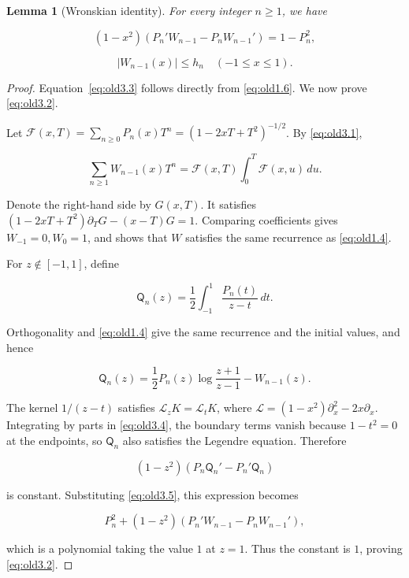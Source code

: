 \documentclass[11pt,a4paper]{article}
\numberwithin{equation}{section}
\newtheorem{lemma}[theorem]{Lemma}
\theoremstyle{definition}
\begin{document}
\begin{lemma}[Wronskian identity]\label{lem:wronskian}
For every integer \(n\ge1\), we have

\begin{equation}
(1-x^2)(P_n'W_{n-1}-P_nW_{n-1}')=1-P_n^2,
\label{eq:old3.2}
\end{equation}

\begin{equation}
|W_{n-1}(x)|\le h_n\quad(-1\le x\le1).
\label{eq:old3.3}
\end{equation}
\end{lemma}

\begin{proof}
Equation~\eqref{eq:old3.3} follows directly from \eqref{eq:old1.6}. We now prove \eqref{eq:old3.2}.

Let \(\mathcal F(x,T)=\sum_{n\ge0}P_n(x)T^n=(1-2xT+T^2)^{-1/2}\). By \eqref{eq:old3.1},

\[
\sum_{n\ge1}W_{n-1}(x)T^n
=\mathcal F(x,T)\int_0^T\mathcal F(x,u)\,du.
\]

Denote the right-hand side by \(G(x,T)\). It satisfies \((1-2xT+T^2)\partial_T G-(x-T)G=1\). Comparing coefficients gives \(W_{-1}=0,W_0=1\), and shows that \(W\) satisfies the same recurrence as \eqref{eq:old1.4}.

For \(z\notin[-1,1]\), define

\begin{equation}
\mathsf Q_n(z)=\frac12\int_{-1}^1\frac{P_n(t)}{z-t}\,dt.
\label{eq:old3.4}
\end{equation}

Orthogonality and \eqref{eq:old1.4} give the same recurrence and the initial values, and hence

\begin{equation}
\mathsf Q_n(z)=\frac12P_n(z)\log\frac{z+1}{z-1}-W_{n-1}(z).
\label{eq:old3.5}
\end{equation}

The kernel \(1/(z-t)\) satisfies \(\mathcal L_zK=\mathcal L_tK\), where \(\mathcal L=(1-x^2)\partial_x^2-2x\partial_x\). Integrating by parts in \eqref{eq:old3.4}, the boundary terms vanish because \(1-t^2=0\) at the endpoints, so \(\mathsf Q_n\) also satisfies the Legendre equation. Therefore

\[
(1-z^2)(P_n\mathsf Q_n'-P_n'\mathsf Q_n)
\]

is constant. Substituting \eqref{eq:old3.5}, this expression becomes

\[
P_n^2+(1-z^2)(P_n'W_{n-1}-P_nW_{n-1}'),
\]

which is a polynomial taking the value $1$ at \(z=1\). Thus the constant is $1$, proving \eqref{eq:old3.2}.
\end{proof}
\end{document}
